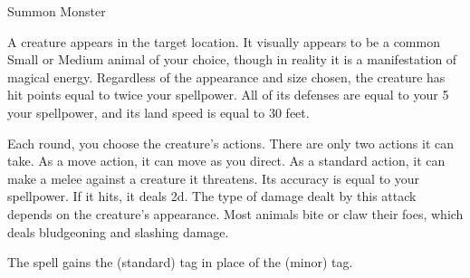 \newpage
\begin{spellsection}{Summon Monster}

\begin{spellheader}
\end{spellheader}

\begin{spellcontent}

\begin{spelltargetinginfo}




\end{spelltargetinginfo}


\begin{spelleffects}



\spelleffect
A creature appears in the target location.
It visually appears to be a common Small or Medium animal of your choice, though in reality it is a manifestation of magical energy.
Regardless of the appearance and size chosen, the creature has hit points equal to twice your spellpower.
All of its defenses are equal to your 5 \add your spellpower, and its land speed is equal to 30 feet.

Each round, you choose the creature's actions.
There are only two actions it can take.
As a move action, it can move as you direct.
As a standard action, it can make a melee  against a creature it threatens.
Its accuracy is equal to your spellpower.
If it hits, it deals  \minus2d.
The type of damage dealt by this attack depends on the creature's appearance.
Most animals bite or claw their foes, which deals bludgeoning and slashing damage.








\end{spelleffects}

\end{spellcontent}
\begin{spellfooter}


\end{spellfooter}
\begin{spellsubcontent}


\begin{spellcantrip}
The spell gains the  (standard) tag in place of the  (minor) tag.
\end{spellcantrip}


\end{spellsubcontent}
\end{spellsection}


